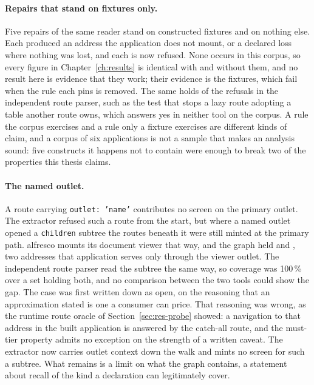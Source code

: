\paragraph{Repairs that stand on fixtures only.} Five repairs of the same reader stand on constructed fixtures and on nothing else. Each produced an address the application does not mount, or a declared loss where nothing was lost, and each is now refused. None occurs in this corpus, so every figure in Chapter~\ref{ch:results} is identical with and without them, and no result here is evidence that they work; their evidence is the fixtures, which fail when the rule each pins is removed. The same holds of the refusals in the independent route parser, such as the test that stops a lazy route adopting a table another route owns, which answers yes in neither tool on the corpus. A rule the corpus exercises and a rule only a fixture exercises are different kinds of claim, and a corpus of six applications is not a sample that makes an analysis sound: five constructs it happens not to contain were enough to break two of the properties this thesis claims.

\paragraph{The named outlet.}
\label{sec:named-outlet}
A route carrying \texttt{outlet: 'name'} contributes no screen on the primary outlet. The extractor refused such a route from the start, but where a named outlet opened a \texttt{children} subtree the routes beneath it were still minted at the primary path. alfresco mounts its document viewer that way, and the graph held  and , two addresses that application serves only through the viewer outlet. The independent route parser read the subtree the same way, so coverage was 100\,\% over a set holding both, and no comparison between the two tools could show the gap. The case was first written down as open, on the reasoning that an approximation stated is one a consumer can price. That reasoning was wrong, as the runtime route oracle of Section~\ref{sec:res-probe} showed: a navigation to that address in the built application is answered by the catch-all route, and the must-tier property admits no exception on the strength of a written caveat. The extractor now carries outlet context down the walk and mints no screen for such a subtree. What remains is a limit on what the graph contains, a statement about recall of the kind a declaration can legitimately cover.

